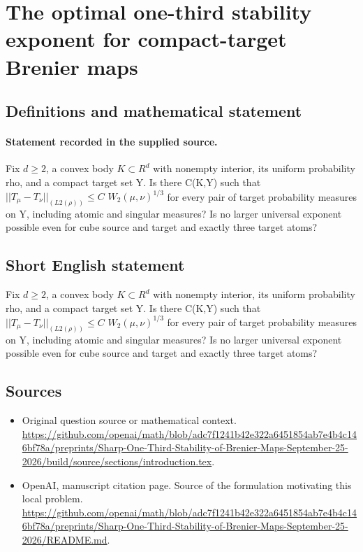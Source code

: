 \documentclass[11pt]{article}
\begin{document}
\section*{The optimal one-third stability exponent for compact-target Brenier maps}\label{30007318}
\subsection{Definitions and mathematical statement}
\paragraph{Statement recorded in the supplied source.}
Fix $d\geq 2$, a convex body $K\subset R^d$ with nonempty interior, its uniform probability rho, and a compact target set Y. Is there C(K,Y) such that $||T_\mu -T_\nu ||_(L2(\rho ))\leq C$ $W_2(\mu ,\nu )^{1/3}$ for every pair of target probability measures on Y, including atomic and singular measures? Is no larger universal exponent possible even for cube source and target and exactly three target atoms?
\subsection{Short English statement}
Fix $d\geq 2$, a convex body $K\subset R^d$ with nonempty interior, its uniform probability rho, and a compact target set Y. Is there C(K,Y) such that $||T_\mu -T_\nu ||_(L2(\rho ))\leq C$ $W_2(\mu ,\nu )^{1/3}$ for every pair of target probability measures on Y, including atomic and singular measures? Is no larger universal exponent possible even for cube source and target and exactly three target atoms?
\subsection{Sources}
\begin{itemize}
\item[S1] Original question source or mathematical context.
\url{https://github.com/openai/math/blob/adc7f1241b42e322a6451854ab7e4b4c146bf78a/preprints/Sharp-One-Third-Stability-of-Brenier-Maps-September-25-2026/build/source/sections/introduction.tex}.
\item[S2] OpenAI, manuscript citation page. Source of the formulation motivating this local problem.
\url{https://github.com/openai/math/blob/adc7f1241b42e322a6451854ab7e4b4c146bf78a/preprints/Sharp-One-Third-Stability-of-Brenier-Maps-September-25-2026/README.md}.
\end{itemize}
\end{document}
